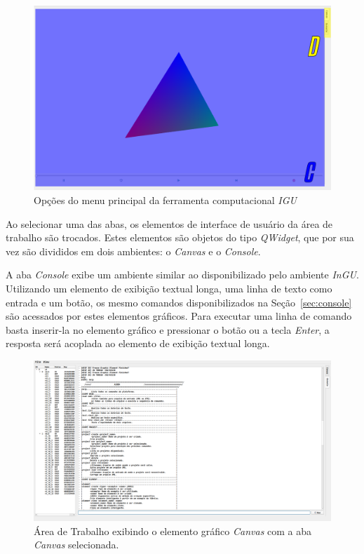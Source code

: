\begin{figure}[!htbp]
	\centering
	\includegraphics[width=\linewidth]{Figures/IGU_001a_34.png}
	\caption{Opções do menu principal da ferramenta computacional \textit{IGU}}
	\label{fig:abas}
\end{figure}

Ao selecionar uma das abas, os elementos de interface de usuário da área de trabalho são trocados. Estes elementos são objetos do tipo \textit{QWidget}, que por sua vez são divididos em dois ambientes: o \textit{Canvas} e o \textit{Console}. 

A aba \textit{Console} exibe um ambiente similar ao disponibilizado pelo ambiente \textit{InGU}. Utilizando um elemento de exibição textual longa, uma linha de texto como entrada e um botão, os mesmo comandos disponibilizados na Seção~\ref{sec:console} são acessados por estes elementos gráficos. Para executar uma linha de comando basta inserir-la no elemento gráfico e pressionar o botão ou a tecla \textit{Enter}, a resposta será acoplada ao elemento de exibição textual longa.

\begin{figure}
	\centering
	\includegraphics[width=.9\linewidth]{Figures/IGU_017.png}
	\caption{Área de Trabalho exibindo o elemento gráfico \textit{Canvas} com a aba \textit{Canvas} selecionada.}
	\label{fig:sfig1}
\end{figure}

